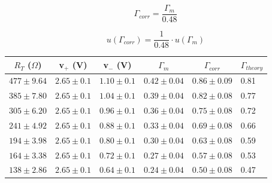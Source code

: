 \begin{enumerate}
\begin{equation}
\Gamma_{corr}=\dfrac{\Gamma_m}{0.48}
\label{equ:twcg3}
\end{equation}

\begin{equation}
u(\Gamma_{corr})=\dfrac{1}{0.48}\cdot u(\Gamma_m)
\label{equ:twcg4}
\end{equation}


\begin{maintable}[ht]
\begin{tabular}{|l|l|l|l|l|l|}
\hline
\multicolumn{1}{|c|}{$R_T$ ($\Omega$)} & \multicolumn{1}{c|}{v$_+$ (V)} & \multicolumn{1}{c|}{v$_-$ (V)} & \multicolumn{1}{c|}{$\Gamma_m$} & \multicolumn{1}{c|}{$\Gamma_{corr}$} & \multicolumn{1}{c|}{$\Gamma_{theory}$} \\ \hline
$477\pm9.64$                           & $2.65\pm0.1$                   & $1.10\pm0.1$                   & $0.42\pm0.04$                   & $0.86\pm0.09$                        & 0.81                                   \\ \hline
$385\pm7.80$                           & $2.65\pm0.1$                   & $1.04\pm0.1$                   & $0.39\pm0.04$                   & $0.82\pm0.08$                        & 0.77                                   \\ \hline
$305\pm6.20$                           & $2.65\pm0.1$                   & $0.96\pm0.1$                   & $0.36\pm0.04$                   & $0.75\pm0.08$                        & 0.72                                   \\ \hline
$241\pm4.92$                           & $2.65\pm0.1$                   & $0.88\pm0.1$                   & $0.33\pm0.04$                   & $0.69\pm0.08$                        & 0.66                                   \\ \hline
$194\pm3.98$                           & $2.65\pm0.1$                   & $0.80\pm0.1$                   & $0.30\pm0.04$                   & $0.63\pm0.08$                        & 0.59                                   \\ \hline
$164\pm3.38$                           & $2.65\pm0.1$                   & $0.72\pm0.1$                   & $0.27\pm0.04$                   & $0.57\pm0.08$                        & 0.53                                   \\ \hline
$138\pm2.86$                           & $2.65\pm0.1$                   & $0.64\pm0.1$                   & $0.24\pm0.04$                   & $0.50\pm0.08$                        & 0.47                                   \\ \hline

\end{tabular}
\end{maintable}
\end{enumerate}
